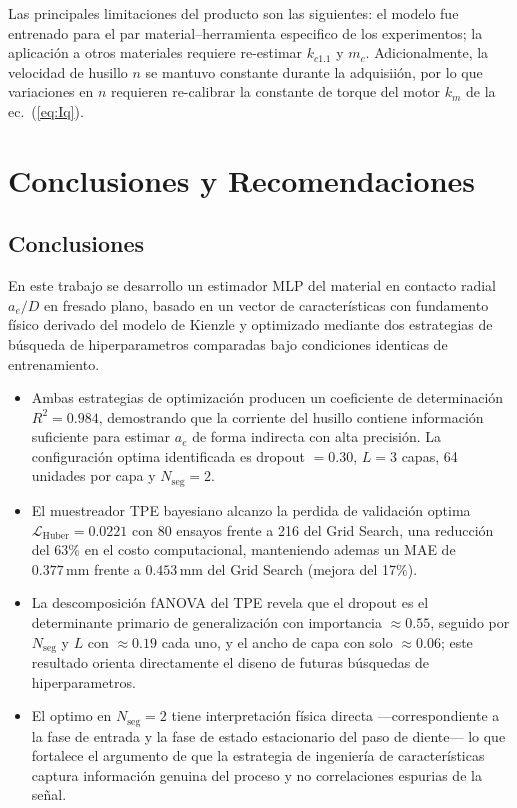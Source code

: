 \documentclass[12pt, letterpaper]{article}
\begin{document}
Las principales limitaciones del producto son las siguientes: el modelo fue entrenado para el par material--herramienta especifico de los experimentos; la aplicación a otros materiales requiere re-estimar $k_{c1.1}$ y $m_c$. Adicionalmente, la velocidad de husillo $n$ se mantuvo constante durante la adquisiión, por lo que variaciones en $n$ requieren re-calibrar la constante de torque del motor $k_m$ de la ec.~(\ref{eq:Iq}).

\section{Conclusiones y Recomendaciones}

\subsection{Conclusiones}

En este trabajo se desarrollo un estimador MLP del material en contacto radial $a_e/D$ en fresado plano, basado en un vector de características con fundamento físico derivado del modelo de Kienzle y optimizado mediante dos estrategias de búsqueda de hiperparametros comparadas bajo condiciones identicas de entrenamiento.

\begin{itemize}
  \item Ambas estrategias de optimización producen un coeficiente de determinación $R^2 = 0.984$, demostrando que la corriente del husillo contiene información suficiente para estimar $a_e$ de forma indirecta con alta precisión. La configuración optima identificada es dropout $= 0.30$, $L = 3$ capas, 64 unidades por capa y $N_{\text{seg}} = 2$.
  \item El muestreador TPE bayesiano alcanzo la perdida de validación optima $\mathcal{L}_{\text{Huber}} = 0.0221$ con 80 ensayos frente a 216 del Grid Search, una reducción del 63\% en el costo computacional, manteniendo ademas un MAE de $0.377\,\text{mm}$ frente a $0.453\,\text{mm}$ del Grid Search (mejora del 17\%).
  \item La descomposición fANOVA del TPE revela que el dropout es el determinante primario de generalización con importancia $\approx 0.55$, seguido por $N_{\text{seg}}$ y $L$ con $\approx 0.19$ cada uno, y el ancho de capa con solo $\approx 0.06$; este resultado orienta directamente el diseno de futuras búsquedas de hiperparametros.
  \item El optimo en $N_{\text{seg}} = 2$ tiene interpretación física directa ---correspondiente a la fase de entrada y la fase de estado estacionario del paso de diente--- lo que fortalece el argumento de que la estrategia de ingeniería de características captura información genuina del proceso y no correlaciones espu\-rias de la señal.
\end{itemize}
\end{document}

